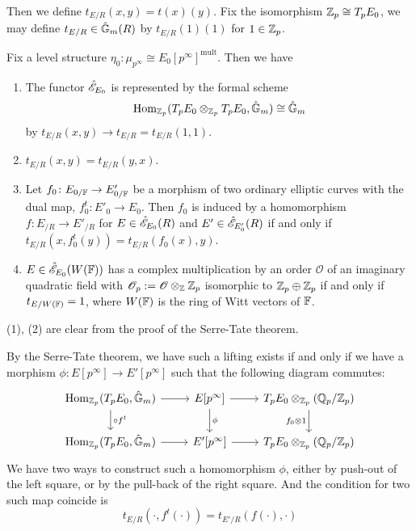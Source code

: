 \documentclass[twoside]{article}
\begin{document}
Then we define $t_{E/R}(x,y)=t(x)(y)$.
Fix the isomorphism $\mathbb{Z}_{p}\cong T_{p}E_{0}$,
we may define $t_{E/R}\in \hat{\mathbb{G}}_{m}(R)$ by $t_{E/R}(1)(1)$ for $1\in \mathbb{Z}_{p}$.

\begin{theorem}
    Fix a level structure $\eta_{0}\colon  \mu_{p^{\infty}}\cong E_{0}[p^{\infty}]^{\mathrm{mult}}$.
    Then we have 
    \begin{enumerate}
        \item The functor $\hat{\mathscr{E}}_{E_{0}}$ is represented by the formal scheme
        \[   \operatorname{Hom}_{\mathbb{Z}_{p}}(T_{p}E_{0}\otimes_{\mathbb{Z}_{p}} T_{p}E_{0},\hat{\mathbb{G}}_{m})\cong \hat{\mathbb{G}}_{m}   \]
        by $t_{E/R}(x,y)\to t_{E/R}=t_{E/R}(1,1)$.

        \item $t_{E/R}(x,y)=t_{E/R}(y,x)$.

        \item Let $f_{0}\colon  E_{0/\mathbb{F}} \to E'_{0/\mathbb{F}}$ be a morphism 
        of two ordinary elliptic curves with the dual map, 
        $f^{t}_{0}\colon  E'_{0} \to E_{0}$. Then $f_{0}$ is induced by a homomorphism 
        $f\colon  E_{/R} \to E'_{/R}$ for $E\in \hat{\mathscr{E}}_{E_{0}}(R)$ and 
        $E'\in \hat{\mathscr{E}}_{E'_{0}}(R)$ if and only if 
        $t_{E/R}(x,f^{t}_{0}(y))=t_{E/R}(f_{0}(x),y)$.
        
        \item $E\in \hat{\mathscr{E}}_{E_{0}}(W(\mathbb{F}))$ has a complex multiplication 
        by an order $\mathscr{O}$ of an imaginary quadratic field with 
        $\mathscr{O}_{p}:=\mathscr{O}\otimes_{\mathbb{Z}}\mathbb{Z}_{p}$ isomorphic to 
        $\mathbb{Z}_{p}\oplus \mathbb{Z}_{p}$ if and only if $t_{E/W(\mathbb{F})}=1$,
        where $W(\mathbb{F})$ is the ring of Witt vectors of $\mathbb{F}$.    
    \end{enumerate}
\end{theorem}

\pf
    (1), (2) are clear from the proof of the Serre-Tate theorem.

    By the Serre-Tate theorem, we have such a lifting exists 
    if and only if we have a morphism $\phi\colon  E[p^{\infty}]\to E'[p^{\infty}]$ 
    such that the following diagram commutes:
    \[ \begin{tikzcd}
        \Hom_{\Zb_{p}}(T_{p}E_{0},\hat{\Gb}_{m})\ar[r]\ar[d, "\circ f^{t}"]&
        E[p^{\infty}] \ar[r]\ar[d, "\phi"] &
        T_{p}E_{0}\otimes_{\Zb_{p}} (\mathbb{Q}_{p}/\Zb_{p}) \ar[d, "f_{0}\otimes 1"'] \\
        \Hom_{\Zb_{p}}(T_{p}E_{0},\hat{\Gb}_{m})\ar[r]&
        E'[p^{\infty}]\ar[r]&
        T_{p}E_{0}\otimes_{\Zb_{p}}(\mathbb{Q}_{p}/\Zb_{p})
    \end{tikzcd} \]
    We have two ways to construct such a homomorphism $\phi$,
    either by push-out of the left square,
    or by the pull-back of the right square.
    And the condition for two such map coincide is 
    \[  t_{E/R}(\cdot,f^{t}(\cdot))=t_{E'/R}(f(\cdot),\cdot)  \]
\end{document}
